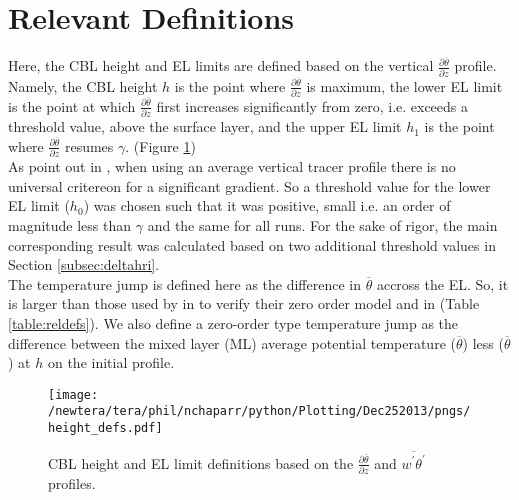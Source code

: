 \clearpage

\section{Relevant Definitions}
\FloatBarrier

Here, the \acs{CBL} height and \acs{EL} limits are defined based on the vertical  $\frac{\partial \overline{\theta}}{\partial z}$
profile.  Namely, the \acs{CBL} height $h$ is the point where  $\frac{\partial \overline{\theta}}{\partial z}$ is maximum, the 
lower \acs{EL} limit is the point at which  $\frac{\partial \overline{\theta}}{\partial z}$ first increases
significantly from zero, i.e. exceeds a threshold value, above the surface layer, and the upper \acs{EL} limit $h_{1}$ is the point where
$\frac{\partial \overline{\theta}}{\partial z}$ resumes $\gamma$. (Figure \ref{fig:hdefs})\\

As \citeauthor{BrooksFowler2} point out in \cite{BrooksFowler2}, when using an average vertical 
tracer profile there is no universal critereon for a significant gradient.  So a threshold value for the
lower \acs{EL} limit ($h_{0}$) was chosen such that it was positive, small i.e. an order of magnitude 
less than $\gamma$ and the same for all runs.  For the sake of rigor, the main corresponding result 
was calculated based on two additional threshold values in Section \ref{subsec:deltahri}.\\

The temperature jump is defined here as the difference in $\overline{\theta}$ accross the \acs{EL}.
So, it is larger than those used by  \citeauthor{FedConzMir04} in \cite{FedConzMir04} to verify 
their zero order model and \citeauthor{SullMoengStev} in \cite{SullMoengStev} (Table \ref{table:reldefs}).
We also define a zero-order type temperature jump as the difference between the mixed layer (\acs{ML}) 
average potential temperature ($\overline{\theta}$) less ($\overline{\theta}$) at $h$ on the initial profile.
\\ 
 
\begin{figure}[htbp]
    \centering
    \texttt{[image: /newtera/tera/phil/nchaparr/python/Plotting/Dec252013/pngs/height\_defs.pdf]}
    \caption{\acs{CBL} height and \acs{EL} limit definitions based on the $\frac{\partial \overline{\theta}}{\partial z}$ and $\overline{w^{\prime}\theta^{\prime}}$ profiles.}
    \label{fig:hdefs}   %
\end{figure}

